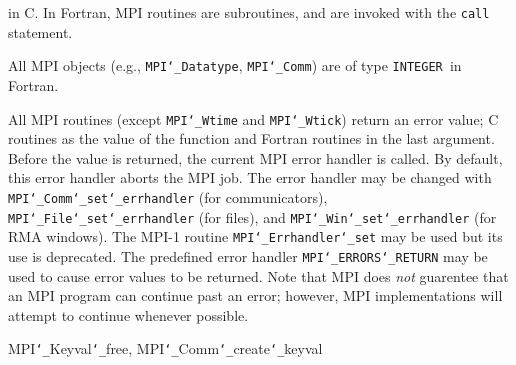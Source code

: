 in C.  In Fortran, MPI routines are subroutines, and are invoked with the
{\tt call} statement.
\par
All MPI objects (e.g., {\tt MPI{\tt \char`\_}Datatype}, {\tt MPI{\tt \char`\_}Comm}) are of type {\tt INTEGER
}in Fortran.
\par
{}
\par
All MPI routines (except {\tt MPI{\tt \char`\_}Wtime} and {\tt MPI{\tt \char`\_}Wtick}) return an error value;
C routines as the value of the function and Fortran routines in the last
argument.  Before the value is returned, the current MPI error handler is
called.  By default, this error handler aborts the MPI job.  The error handler
may be changed with {\tt MPI{\tt \char`\_}Comm{\tt \char`\_}set{\tt \char`\_}errhandler} (for communicators),
{\tt MPI{\tt \char`\_}File{\tt \char`\_}set{\tt \char`\_}errhandler} (for files), and {\tt MPI{\tt \char`\_}Win{\tt \char`\_}set{\tt \char`\_}errhandler} (for
RMA windows).  The MPI-1 routine {\tt MPI{\tt \char`\_}Errhandler{\tt \char`\_}set} may be used but
its use is deprecated.  The predefined error handler
{\tt MPI{\tt \char`\_}ERRORS{\tt \char`\_}RETURN} may be used to cause error values to be returned.
Note that MPI does {\em not} guarentee that an MPI program can continue past
an error; however, MPI implementations will attempt to continue whenever
possible.
\par
{}
\par
{}
 MPI{\tt \char`\_}Keyval{\tt \char`\_}free, MPI{\tt \char`\_}Comm{\tt \char`\_}create{\tt \char`\_}keyval
\nextline
{}
\endmanpage
